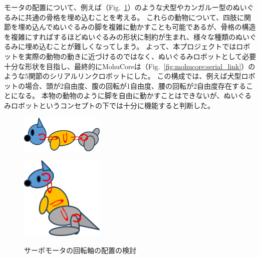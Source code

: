 \documentclass[uplatex,a4paper,12pt]{jsarticle}
\renewcommand{\figurename}{Fig.}
\newcommand{\figref}[1]{\figurename~\ref{#1}}
\begin{document}
モータの配置について、例えば（\figref{fig:mohucore:rot_animal}）のような犬型やカンガルー型のぬいぐるみに共通の骨格を埋め込むことを考える。
これらの動物について、四肢に関節を埋め込んでぬいぐるみの脚を複雑に動かすことも可能であるが、骨格の構造を複雑にすればするほどぬいぐるみの形状に制約が生まれ、様々な種類のぬいぐるみに埋め込むことが難しくなってしまう。
よって、本プロジェクトではロボットを実際の動物の動きに近づけるのではなく、ぬいぐるみロボットとして必要十分な形状を目指し、最終的にMohuCoreは（\figref{fig:mohucore:serial_link}）のような5関節のシリアルリンクロボットにした。
この構成では、例えば犬型ロボットの場合、頭が2自由度、腹の回転が1自由度、腰の回転が2自由度存在することになる。
本物の動物のように脚を自由に動かすことはできないが、ぬいぐるみロボットというコンセプトの下では十分に機能すると判断した。

\begin{figure}[htbp]
  \centering
  \begin{minipage}[c]{0.48\linewidth}
    \centering
    \includegraphics[keepaspectratio,width=4cm,clip]{images/mohucore/rot_dog.png}
    \label{fig:mohucore:rot_dog}
  \end{minipage}
  \begin{minipage}[c]{0.48\linewidth}
    \centering
    \includegraphics[keepaspectratio,width=4cm,clip]{images/mohucore/rot_kangaroo.png}
    \label{fig:mohucore:rot_kangaroo}
  \end{minipage}
  \caption{サーボモータの回転軸の配置の検討}
  \label{fig:mohucore:rot_animal}
\end{figure}
\end{document}
